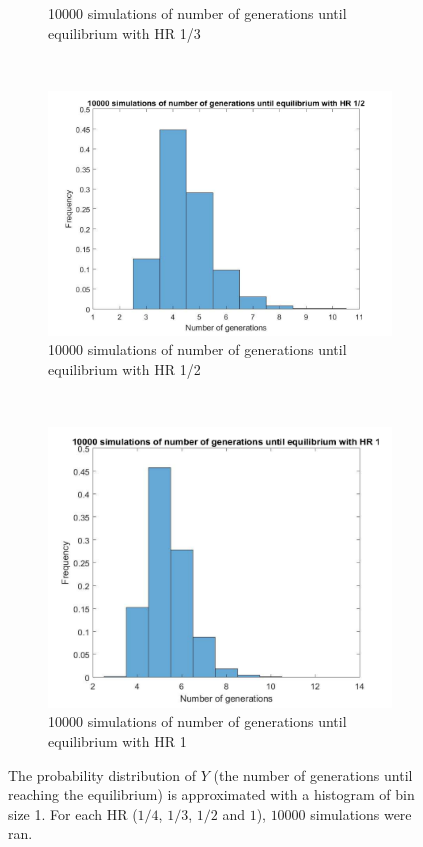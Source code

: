 \begin{figure}[H]
\begin{subfigure}{0.45\textwidth}
        \caption{10000 simulations of number of generations until equilibrium with HR 1/3}
        \label{hist hap 1/3}
    \end{subfigure}
	~
    \begin{subfigure}{0.45\textwidth}
        \includegraphics[width=\textwidth]{GenormHistogramAantalgen2.pdf}
        \caption{10000 simulations of number of generations until equilibrium with HR 1/2}
        \label{hist hap 1/2}
    \end{subfigure}
    ~
    \begin{subfigure}{0.45\textwidth}
        \includegraphics[width=\textwidth]{GenormHistogramAantalgen1.pdf}
        \caption{10000 simulations of number of generations until equilibrium with HR 1}
        \label{hist hap 1}
    \end{subfigure}
    \caption{The probability distribution of $Y$ (the number of generations until reaching the equilibrium) is approximated with a histogram of bin size 1. 
    For each HR ($1/4$, $1/3$, $1/2$ and $1$), $10000$ simulations were ran.}
    \label{fig:histogram}
\end{figure}


